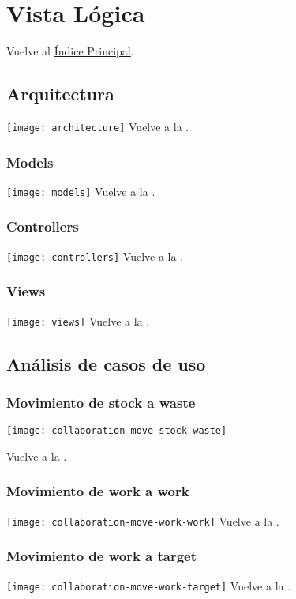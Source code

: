 \newpage{}
\section{Vista Lógica}\label{logictoc}

\secttoc
Vuelve al \hyperlink{toc}{Índice Principal}.

\newpage{}
\subsection{Arquitectura}
\texttt{[image: architecture]}
Vuelve a la .

\newpage{}
\subsubsection{Models}
\texttt{[image: models]}
Vuelve a la .

\newpage{}
\subsubsection{Controllers}
\texttt{[image: controllers]}
Vuelve a la .

\newpage{}
\subsubsection{Views}
\texttt{[image: views]}
Vuelve a la .

\newpage{}
\subsection{Análisis de casos de uso}

\subsubsection{Movimiento de stock a waste}
\texttt{[image: collaboration-move-stock-waste]}

Vuelve a la .

\newpage{}
\subsubsection{Movimiento de work a work}
\texttt{[image: collaboration-move-work-work]}
Vuelve a la .

\newpage{}
\subsubsection{Movimiento de work a target}
\texttt{[image: collaboration-move-work-target]}
Vuelve a la .


